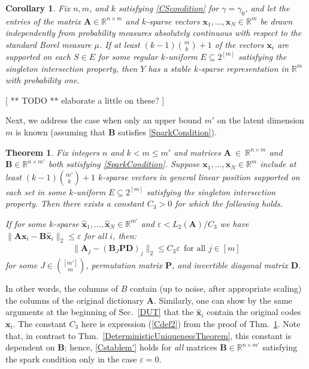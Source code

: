\documentclass[9pt,twocolumn]{pnas-new}
\newtheorem{theorem}{Theorem}
\newtheorem{corollary}{Corollary}
\begin{document}
\begin{corollary}\label{ProbabilisticCor}
Fix $n, m$, and $k$ satisfying \eqref{CScondition} for $\gamma = \gamma_0$, and let the entries of the matrix $\mathbf{A} \in \mathbb{R}^{n \times m}$ and $k$-sparse vectors $\mathbf{x}_1, \ldots, \mathbf{x}_N \in \mathbb{R}^m$ be drawn independently from probability measures absolutely continuous with respect to the standard Borel measure $\mu$. If at least $(k-1){m \choose k} + 1$ of the vectors $\mathbf{x}_i$ are supported on each $S \in E$ for some regular $k$-uniform $E \subseteq 2^{[m]}$ satisfying the singleton intersection property, then $Y$ has a stable $k$-sparse representation in $\mathbb{R}^m$ with probability one.
\end{corollary}

[ ** TODO ** elaborate a little on these? ]

Next, we address the case when only an upper bound $m'$ on the latent dimension $m$ is known (assuming that $\mathbf{B}$ satisfies \eqref{SparkCondition}).

\begin{theorem}\label{DeterministicUniquenessTheorem2}
Fix integers $n$ and $k < m \leq m'$ and matrices $\mathbf{A}~\in~\mathbb{R}^{n \times m}$ and $\mathbf{B} \in \mathbb{R}^{n \times m'}$ both satisfying \eqref{SparkCondition}. Suppose \mbox{$\mathbf{x}_1, \ldots, \mathbf{x}_N \in \mathbb{R}^m$} include at least \mbox{$(k-1){m' \choose k}+1$} $k$-sparse vectors in general linear position supported on each set in some $k$-uniform $E \subseteq 2^{[m]}$ satisfying the singleton intersection property. Then there exists a constant $C_3 > 0$ for which the following holds.

If for some $k$-sparse $\mathbf{\hat x}_1, \ldots, \mathbf{\hat x}_N \in \mathbb{R}^{m'}$ and $\varepsilon < L_2(\mathbf{A}) / C_3$ we have \mbox{$\|\mathbf{A}\mathbf{x}_i - \mathbf{B}\mathbf{\hat x}_i\|_2 \leq \varepsilon$} for all $i$, then:
\begin{align}\label{Cstablem'}
\|\mathbf{A}_j-(\mathbf{B}_J\mathbf{PD})_j\|_2 \leq C_3\varepsilon \ \ \text{for all $j \in [m]$}
\end{align}
%
for some $J \in {[m'] \choose m}$, permutation matrix $\mathbf{P}$, and invertible diagonal matrix $\mathbf{D}$.
\end{theorem}

In other words, the columns of $B$ contain (up to noise, after appropriate scaling) the columns of the original dictionary $\mathbf{A}$. Similarly, one can show by the same arguments at the beginning of Sec.~\ref{DUT} that the $\mathbf{\hat x}_i$ contain the original codes $\mathbf{x}_i$. The constant $C_3$ here is expression (\ref{Cdef2}) from the proof of Thm.~\ref{DeterministicUniquenessTheorem2}. Note that, in contrast to Thm.~\ref{DeterministicUniquenessTheorem}, this constant is dependent on $\mathbf{B}$; hence, \eqref{Cstablem'} holds for \emph{all} matrices $\mathbf{B} \in \mathbb{R}^{n \times m'}$ satisfying the spark condition only in the case $\varepsilon = 0$. 
\end{document}
